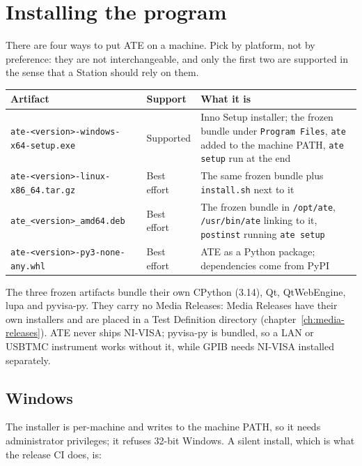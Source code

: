 \chapter{Installing the program}\label{ch:installing}

There are four ways to put ATE on a machine. Pick by platform, not by preference: they are not
interchangeable, and only the first two are supported in the sense that a Station should rely on
them.

\begin{center}
\footnotesize
\begin{tabular}{@{}>{\raggedright\arraybackslash}p{3.8cm}>{\raggedright\arraybackslash}p{2.4cm}>{\raggedright\arraybackslash}p{8.6cm}@{}}
\toprule
Artifact & Support & What it is \\
\midrule
\texttt{ate-<version>-}\allowbreak\texttt{windows-x64-setup.exe} & Supported & Inno Setup installer; the frozen bundle
  under \texttt{Program Files}, \texttt{ate} added to the machine PATH, \texttt{ate setup} run at
  the end \\
\texttt{ate-<version>-}\allowbreak\texttt{linux-x86\_64.tar.gz} & Best effort & The same frozen bundle plus
  \texttt{install.sh} next to it \\
\texttt{ate\_<version>}\allowbreak\texttt{\_amd64.deb} & Best effort & The frozen bundle in \texttt{/opt/ate},
  \texttt{/usr/bin/ate} linking to it, \texttt{postinst} running \texttt{ate setup} \\
\texttt{ate-<version>-py3-none-any.whl} & Best effort & ATE as a Python package; dependencies come
  from PyPI \\
\bottomrule
\end{tabular}
\end{center}

The three frozen artifacts bundle their own CPython (3.14), Qt, QtWebEngine, lupa and pyvisa-py.
They carry no Media Releases: Media Releases have their own installers and are placed in a
Test Definition directory (chapter~\ref{ch:media-releases}). ATE never ships NI-VISA; pyvisa-py
is bundled, so a LAN or USBTMC instrument works without it, while GPIB needs NI-VISA installed
separately.

\section{Windows}

The installer is per-machine and writes to the machine PATH, so it needs administrator
privileges; it refuses 32-bit Windows. A silent install, which is what the release CI does, is:

